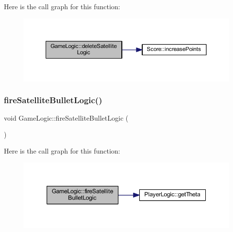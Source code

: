 Here is the call graph for this function\+:\nopagebreak
\begin{figure}[H]
\begin{center}
\leavevmode
\includegraphics[width=350pt]{class_game_logic_a3954ee824ac3acc8753f61f97d41ce89_cgraph}
\end{center}
\end{figure}
\mbox{\label{class_game_logic_ab84e34d803932a798b76f1c3b8a4af83}} 
\subsubsection{\texorpdfstring{fire\+Satellite\+Bullet\+Logic()}{fireSatelliteBulletLogic()}}
{\footnotesize\ttfamily void Game\+Logic\+::fire\+Satellite\+Bullet\+Logic (\begin{DoxyParamCaption}{ }\end{DoxyParamCaption})}

Here is the call graph for this function\+:\nopagebreak
\begin{figure}[H]
\begin{center}
\leavevmode
\includegraphics[width=347pt]{class_game_logic_ab84e34d803932a798b76f1c3b8a4af83_cgraph}
\end{center}
\end{figure}
\mbox{\label{class_game_logic_a084386ea39d66e3963ba248f7affabe0}} 
